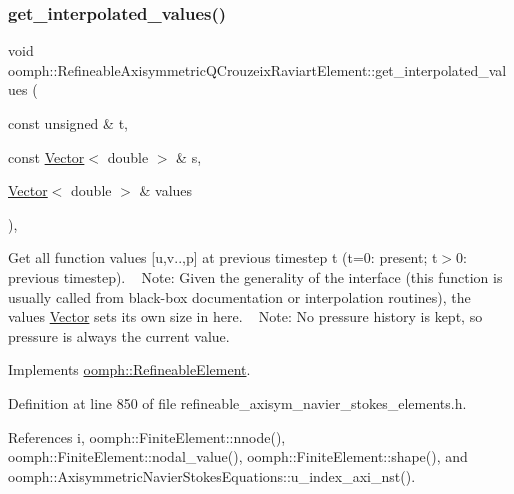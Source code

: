 \subsubsection{\texorpdfstring{get\+\_\+interpolated\+\_\+values()}{get\_interpolated\_values()}\hspace{0.1cm}{\footnotesize\ttfamily [2/2]}}
{\footnotesize\ttfamily void oomph\+::\+Refineable\+Axisymmetric\+Q\+Crouzeix\+Raviart\+Element\+::get\+\_\+interpolated\+\_\+values (\begin{DoxyParamCaption}\item[{const unsigned \&}]{t,  }\item[{const \hyperlink{classoomph_1_1Vector}{Vector}$<$ double $>$ \&}]{s,  }\item[{\hyperlink{classoomph_1_1Vector}{Vector}$<$ double $>$ \&}]{values }\end{DoxyParamCaption})\hspace{0.3cm}{\ttfamily [inline]}, {\ttfamily [virtual]}}



Get all function values \mbox{[}u,v..,p\mbox{]} at previous timestep t (t=0\+: present; t$>$0\+: previous timestep). ~\newline
 Note\+: Given the generality of the interface (this function is usually called from black-\/box documentation or interpolation routines), the values \hyperlink{classoomph_1_1Vector}{Vector} sets its own size in here. ~\newline
Note\+: No pressure history is kept, so pressure is always the current value. 



Implements \hyperlink{classoomph_1_1RefineableElement_ada6f0efe831ffefb1d2829ce01d45bfc}{oomph\+::\+Refineable\+Element}.



Definition at line 850 of file refineable\+\_\+axisym\+\_\+navier\+\_\+stokes\+\_\+elements.\+h.



References i, oomph\+::\+Finite\+Element\+::nnode(), oomph\+::\+Finite\+Element\+::nodal\+\_\+value(), oomph\+::\+Finite\+Element\+::shape(), and oomph\+::\+Axisymmetric\+Navier\+Stokes\+Equations\+::u\+\_\+index\+\_\+axi\+\_\+nst().

\mbox{\label{classoomph_1_1RefineableAxisymmetricQCrouzeixRaviartElement_a8ec04aa9fe1b416afd6fadcbc571d47e}} 
